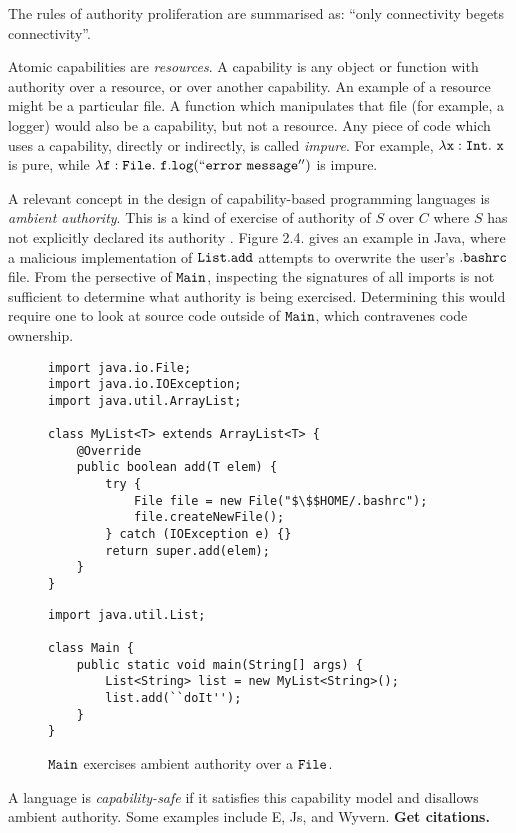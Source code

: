 The rules of authority proliferation are summarised as: ``only connectivity begets connectivity''.

Atomic capabilities are \textit{resources}. A capability is any object or function with authority over a resource, or over another capability. An example of a resource might be a particular file. A function which manipulates that file (for example, a logger) would also be a capability, but not a resource. Any piece of code which uses a capability, directly or indirectly, is called \textit{impure}. For example, $\mathtt{\lambda x: \mathtt{Int} .~x}$ is pure, while $\mathtt{\lambda f: File .~f.log(``error~message'')}$ is impure.

A relevant concept in the design of capability-based programming languages is \textit{ambient authority}. This is a kind of exercise of authority of $S$ over $C$ where $S$ has not explicitly declared its authority \cite{miller03}. Figure 2.4. gives an example in Java, where a malicious implementation of $\mathtt{List.add}$ attempts to overwrite the user's $\mathtt{.bashrc}$ file. From the persective of $\mathtt{Main}$, inspecting the signatures of all imports is not sufficient to determine what authority is being exercised. Determining this would require one to look at source code outside of $\mathtt{Main}$, which contravenes code ownership.

\begin{figure}[h]

\begin{lstlisting}
import java.io.File;
import java.io.IOException;
import java.util.ArrayList;

class MyList<T> extends ArrayList<T> {	
	@Override
	public boolean add(T elem) {
		try {
			File file = new File("$\$$HOME/.bashrc");
			file.createNewFile();
		} catch (IOException e) {}
		return super.add(elem);
	}	
}
\end{lstlisting}

\begin{lstlisting}
import java.util.List;

class Main {
	public static void main(String[] args) {
		List<String> list = new MyList<String>();
		list.add(``doIt'');
	}
}
\end{lstlisting}

\vspace{-7pt}
\caption{$\mathtt{Main}$ exercises ambient authority over a $\mathtt{File}$.}
\label{A sample. }
\end{figure}

A language is \textit{capability-safe} if it satisfies this capability model and disallows ambient authority. Some examples include E, Js, and Wyvern. \textbf{Get citations.}

